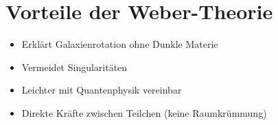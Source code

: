 \section{Vorteile der Weber-Theorie}
\begin{itemize}
\item Erklärt Galaxienrotation ohne Dunkle Materie
\item Vermeidet Singularitäten
\item Leichter mit Quantenphysik vereinbar
\item Direkte Kräfte zwischen Teilchen (keine Raumkrümmung)
\end{itemize}